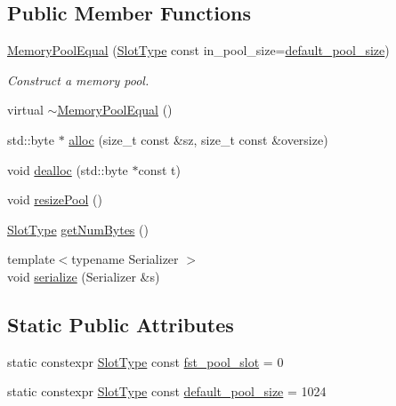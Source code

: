 \subsection*{Public Member Functions}
\begin{DoxyCompactItemize}
\item 
\hyperlink{structvt_1_1pool_1_1_memory_pool_equal_ad1f64e3c3c70d8c037c592f96443d02a}{Memory\+Pool\+Equal} (\hyperlink{structvt_1_1pool_1_1_memory_pool_equal_af05a2c24c95c666b20e3758745be746b}{Slot\+Type} const in\+\_\+pool\+\_\+size=\hyperlink{structvt_1_1pool_1_1_memory_pool_equal_a8daca02e94e9ab587670808525561c71}{default\+\_\+pool\+\_\+size})
\begin{DoxyCompactList}\small\item\em Construct a memory pool. \end{DoxyCompactList}\item 
virtual \hyperlink{structvt_1_1pool_1_1_memory_pool_equal_aa6f87becb85f4fc575b2d5dcd68d89af}{$\sim$\+Memory\+Pool\+Equal} ()
\item 
std\+::byte $\ast$ \hyperlink{structvt_1_1pool_1_1_memory_pool_equal_aa142ba97f3dda1ad1843175579eb1994}{alloc} (size\+\_\+t const \&sz, size\+\_\+t const \&oversize)
\item 
void \hyperlink{structvt_1_1pool_1_1_memory_pool_equal_afdb11f39c6d8b86c797657092f90b85e}{dealloc} (std\+::byte $\ast$const t)
\item 
void \hyperlink{structvt_1_1pool_1_1_memory_pool_equal_a42ba3ac19921517b82c4e6ff4cba6b80}{resize\+Pool} ()
\item 
\hyperlink{structvt_1_1pool_1_1_memory_pool_equal_af05a2c24c95c666b20e3758745be746b}{Slot\+Type} \hyperlink{structvt_1_1pool_1_1_memory_pool_equal_a222efeb2d8fee03b4fb8c275f9cfa1ac}{get\+Num\+Bytes} ()
\item 
{\footnotesize template$<$typename Serializer $>$ }\\void \hyperlink{structvt_1_1pool_1_1_memory_pool_equal_a49e3617769cd0bdcb3957b93466595a3}{serialize} (Serializer \&s)
\end{DoxyCompactItemize}
\subsection*{Static Public Attributes}
\begin{DoxyCompactItemize}
\item 
static constexpr \hyperlink{structvt_1_1pool_1_1_memory_pool_equal_af05a2c24c95c666b20e3758745be746b}{Slot\+Type} const \hyperlink{structvt_1_1pool_1_1_memory_pool_equal_a11e4d0dbd2ea5c1f93fa8cdf36c1e60a}{fst\+\_\+pool\+\_\+slot} = 0
\item 
static constexpr \hyperlink{structvt_1_1pool_1_1_memory_pool_equal_af05a2c24c95c666b20e3758745be746b}{Slot\+Type} const \hyperlink{structvt_1_1pool_1_1_memory_pool_equal_a8daca02e94e9ab587670808525561c71}{default\+\_\+pool\+\_\+size} = 1024
\end{DoxyCompactItemize}
